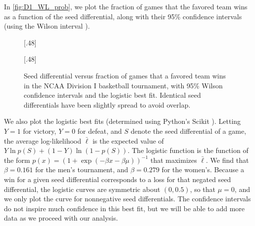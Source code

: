 \documentclass{article}
\newcommand{\betaBbmD}{0.161}
\newcommand{\betaBbwD}{0.279}
\begin{document}
%
In \autoref{fig:D1_WL_prob}, we plot the fraction of games that the favored team wins as a function of the seed differential, along with their 95\% confidence intervals (using the Wilson interval \cite{Brown}).
\begin{figure}
\subcaptionbox{\label{fig:mD1_WL_prob}Men's. $\beta=\betaBbmD$}[.48\textwidth]{%
%
}\hfill
\subcaptionbox{\label{fig:wD1_WL_prob}Women's. $\beta=\betaBbwD$}[.48\textwidth]{%
}
\caption{\label{fig:D1_WL_prob}Seed differential versus fraction of games that a favored team wins in the NCAA Division I basketball tournament, with 95\% Wilson confidence intervals and the logistic best fit.  Identical seed differentials have been slightly spread to avoid overlap.}
\end{figure}

We also plot the logistic best fits (determined using Python's Scikit \cite{scikit-learn}).  Letting $Y=1$ for victory, $Y=0$ for defeat, and $S$ denote the seed differential of a game, the average log-likelihood $\bar\ell$ is the expected value of $Y\ln p(S)+(1-Y)\ln(1-p(S))$.  The logistic function is the function of the form $p(x)=(1+\exp(-\beta x-\beta\mu))^{-1}$ that maximizes $\bar\ell$.  We find that $\beta=\betaBbmD$ for the men's tournament, and $\beta=\betaBbwD$ for the women's.
Because a win for a given seed differential corresponds to a loss for that negated seed differential, the logistic curves are symmetric about $(0,0.5)$, so that $\mu=0$, and we only plot the curve for nonnegative seed differentials.  The confidence intervals do not inspire much confidence in this best fit, but we will be able to add more data as we proceed with our analysis.
\end{document}
